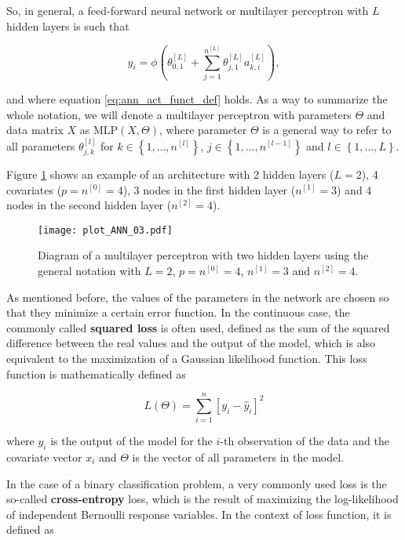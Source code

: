 So, in general, a feed-forward neural network or multilayer perceptron with $L$ hidden layers is such that

$$
  y_i = \phi \left( \theta_{0,1}^{[L]} +  \sum_{j = 1}^{n^{[L]}} \theta_{j,1}^{[L]} a_{k,i}^{[L]} \right),
$$

and where equation \ref{eq:ann_act_funct_def} holds. As a way to summarize the whole notation, we will denote a multilayer perceptron with parameters $\Theta$ and data matrix $X$ as $\mathrm{MLP} \left(X, \Theta \right)$, where parameter $\Theta$ is a general way to refer to all parameters $\theta_{j,k}^{[l]}$ for $k \in \left\{ 1, \ldots, n^{[l]} \right\}$, $j \in \left\{ 1, \ldots, n^{[l-1]} \right\}$ and $l \in \left\{ 1, \ldots, L \right\}$.

Figure \ref{fig:theory_ANN_diagram_03} shows an example of an architecture with 2 hidden layers ($L = 2$), 4 covariates ($p = n^{[0]} = 4$), 3 nodes in the first hidden layer ($n^{[1]} = 3$) and 4 nodes in the second hidden layer ($n^{[2]} = 4$).

\begin{figure}[H]
    \centering
    \texttt{[image: plot\_ANN\_03.pdf]}
    \caption{Diagram of a multilayer perceptron with two hidden layers using the general notation with $L = 2$, $p = n^{[0]} = 4$, $n^{[1]} = 3$ and $n^{[2]} = 4$.}
    \label{fig:theory_ANN_diagram_03}
\end{figure}

As mentioned before, the values of the parameters in the network are chosen so that they minimize a certain error function. In the continuous case, the commonly called \textbf{squared loss} is often used, defined as the sum of the squared difference between the real values and the output of the model, which is also equivalent to the maximization of a Gaussian likelihood function. This loss function is mathematically defined as

\begin{equation*}
  L(\Theta) = \sum_{i = 1}^n \left[ y_i - \hat{y}_i \right]^2
\end{equation*}

where $\hat{y_i}$ is the output of the model for the $i$-th observation of the data and the covariate vector $x_i$ and $\Theta$ is the vector of all parameters in the model.

In the case of a binary classification problem, a very commonly used loss is the so-called \textbf{cross-entropy} loss, which is the result of maximizing the log-likelihood of independent Bernoulli response variables. In the context of loss function, it is defined as

